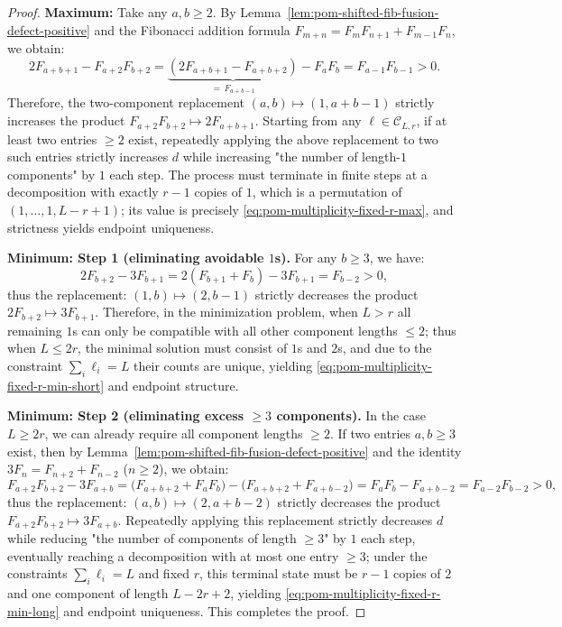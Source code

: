 \begin{proof}
\textbf{Maximum:} Take any $a,b\ge 2$. By Lemma~\ref{lem:pom-shifted-fib-fusion-defect-positive} and the Fibonacci addition formula
\(
F_{m+n}=F_mF_{n+1}+F_{m-1}F_n
\),
we obtain:
\[
2F_{a+b+1}-F_{a+2}F_{b+2}
=\underbrace{(2F_{a+b+1}-F_{a+b+2})}_{=\,F_{a+b-1}}
-F_aF_b
=F_{a-1}F_{b-1}>0.
\]
Therefore, the two-component replacement
\(
(a,b)\mapsto(1,a+b-1)
\)
strictly increases the product $F_{a+2}F_{b+2}\mapsto 2F_{a+b+1}$.
Starting from any $\boldsymbol{\ell}\in\mathcal{C}_{L,r}$, if at least two entries $\ge 2$ exist, repeatedly applying the above replacement to two such entries strictly increases $d$ while increasing "the number of length-$1$ components" by $1$ each step.
The process must terminate in finite steps at a decomposition with exactly $r-1$ copies of $1$, which is a permutation of $(1,\dots,1,L-r+1)$; its value is precisely \eqref{eq:pom-multiplicity-fixed-r-max}, and strictness yields endpoint uniqueness.
\par
\textbf{Minimum: Step 1 (eliminating avoidable $1$s).} For any $b\ge 3$, we have:
\[
2F_{b+2}-3F_{b+1}
=2(F_{b+1}+F_b)-3F_{b+1}
=F_{b-2}>0,
\]
thus the replacement:
\(
(1,b)\mapsto(2,b-1)
\)
strictly decreases the product $2F_{b+2}\mapsto 3F_{b+1}$.
Therefore, in the minimization problem, when $L>r$ all remaining $1$s can only be compatible with all other component lengths $\le 2$; thus when $L\le 2r$, the minimal solution must consist of $1$s and $2$s, and due to the constraint $\sum_i\ell_i=L$ their counts are unique, yielding \eqref{eq:pom-multiplicity-fixed-r-min-short} and endpoint structure.
\par
\textbf{Minimum: Step 2 (eliminating excess $\ge 3$ components).} In the case $L\ge 2r$, we can already require all component lengths $\ge 2$.
If two entries $a,b\ge 3$ exist, then by Lemma~\ref{lem:pom-shifted-fib-fusion-defect-positive} and the identity $3F_n=F_{n+2}+F_{n-2}$ ($n\ge 2$), we obtain:
\[
F_{a+2}F_{b+2}-3F_{a+b}
=\bigl(F_{a+b+2}+F_aF_b\bigr)-\bigl(F_{a+b+2}+F_{a+b-2}\bigr)
=F_aF_b-F_{a+b-2}
=F_{a-2}F_{b-2}>0,
\]
thus the replacement:
\(
(a,b)\mapsto(2,a+b-2)
\)
strictly decreases the product $F_{a+2}F_{b+2}\mapsto 3F_{a+b}$.
Repeatedly applying this replacement strictly decreases $d$ while reducing "the number of components of length $\ge 3$" by $1$ each step, eventually reaching a decomposition with at most one entry $\ge 3$; under the constraints $\sum_i\ell_i=L$ and fixed $r$, this terminal state must be $r-1$ copies of $2$ and one component of length $L-2r+2$, yielding \eqref{eq:pom-multiplicity-fixed-r-min-long} and endpoint uniqueness. This completes the proof.
\end{proof}

